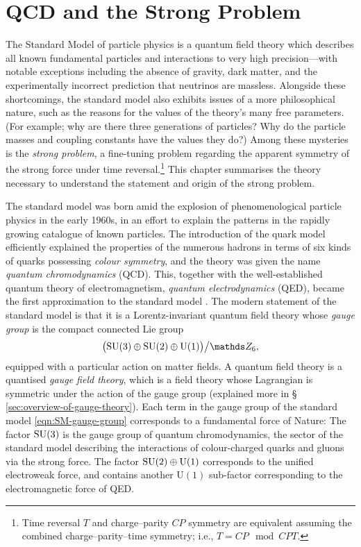 \chapter{QCD and the Strong \CP Problem}

{The Standard Model} of particle physics is a quantum field theory which describes all known fundamental particles and interactions to very high precision---with notable exceptions including the absence of gravity, dark matter, and the experimentally incorrect prediction that neutrinos are massless.
Alongside these shortcomings, the standard model also exhibits issues of a more philosophical nature, such as the reasons for the values of the theory's many free parameters. (For example; why are there three generations of particles? Why do the particle masses and coupling constants have the values they do?)
Among these mysteries is the \emph{strong \CP problem}, a fine-tuning problem regarding the apparent symmetry of the strong force under time reversal.\footnote{Time reversal $T$ and charge--parity $CP$ symmetry are equivalent assuming the combined charge--parity--time symmetry; i.e., $T = CP \mod CPT$.}
This chapter summarises the theory necessary to understand the statement and origin of the strong \CP problem.

The standard model was born amid the explosion of phenomenological particle physics in the early 1960s, in an effort to explain the patterns in the rapidly growing catalogue of known particles.
The introduction of the quark model efficiently explained the properties of the numerous hadrons in terms of six kinds of quarks possessing \emph{colour symmetry}, and the theory was given the name \emph{quantum chromodynamics} (QCD). This, together with the well-established quantum theory of electromagnetism, \emph{quantum electrodynamics} (QED), became the first approximation to the standard model \cite{Weinberg_2004-history}.
The modern statement of the standard model is that it is a Lorentz-invariant {quantum field theory} whose \emph{gauge group} is the compact connected Lie group
\begin{align}
	\qty\big(\SU(3)\oplus\SU(2)\oplus\mathrm{U}(1))\big/\ZZ_6
	\label{eqn:SM-gauge-group}
,\end{align}
equipped with a particular action on matter fields.
A quantum field theory is a quantised \emph{gauge field theory}, which is a field theory whose Lagrangian is symmetric under the action of the gauge group (explained more in §\,\ref{sec:overview-of-gauge-theory}).
Each term in the gauge group of the standard model \eqref{eqn:SM-gauge-group} corresponds to a fundamental force of Nature:
The factor $\mathrm{SU}(3)$ is the gauge group of quantum chromodynamics, the sector of the standard model describing the interactions of colour-charged quarks and gluons via the strong force.
The factor $\mathrm{SU}(2)\oplus\mathrm{U}(1)$ corresponds to the unified electroweak force, and contains another $\mathrm{U}(1)$ sub-factor corresponding to the electromagnetic force of QED.


